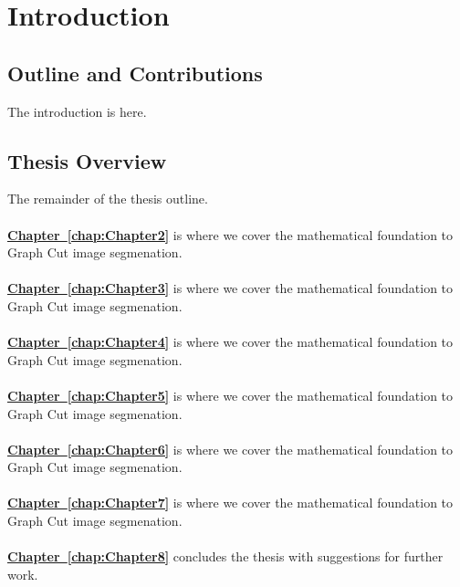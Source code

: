 
\chapter{Introduction} %

\label{chap:Chapter1} %


\newcommand{\keyword}[1]{\textbf{#1}}
\newcommand{\tabhead}[1]{\textbf{#1}}
\newcommand{\code}[1]{\texttt{#1}}
\newcommand{\file}[1]{\texttt{\bfseries#1}}
\newcommand{\option}[1]{\texttt{\itshape#1}}


\section{Outline and Contributions}
The introduction is here.


\section{Thesis Overview}

The remainder of the thesis outline.\\
\\
\textbf{\hyperref[chap:Chapter2]{Chapter~\ref*{chap:Chapter2}}} is where we cover the mathematical foundation to Graph Cut image segmenation.\\
\\
\textbf{\hyperref[chap:Chapter3]{Chapter~\ref*{chap:Chapter3}}} is where we cover the mathematical foundation to Graph Cut image segmenation.\\
\\
\textbf{\hyperref[chap:Chapter4]{Chapter~\ref*{chap:Chapter4}}} is where we cover the mathematical foundation to Graph Cut image segmenation.\\
\\
\textbf{\hyperref[chap:Chapter5]{Chapter~\ref*{chap:Chapter5}}} is where we cover the mathematical foundation to Graph Cut image segmenation.\\
\\
\textbf{\hyperref[chap:Chapter6]{Chapter~\ref*{chap:Chapter6}}} is where we cover the mathematical foundation to Graph Cut image segmenation.\\
\\
\textbf{\hyperref[chap:Chapter7]{Chapter~\ref*{chap:Chapter7}}} is where we cover the mathematical foundation to Graph Cut image segmenation.\\
\\
\textbf{\hyperref[chap:Chapter8]{Chapter~\ref*{chap:Chapter8}}} concludes the thesis with suggestions for further work.
